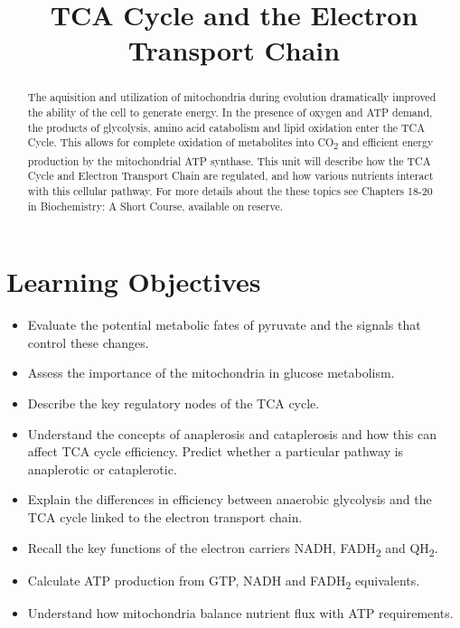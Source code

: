 \documentclass{tufte-handout}
\title{TCA Cycle and the Electron Transport Chain}
\author{}
\date{}  %
\begin{document}
\maketitle%

\begin{abstract}
\noindent The aquisition and utilization of mitochondria during evolution dramatically improved the ability of the cell to generate energy.  In the presence of oxygen and ATP demand, the products of glycolysis, amino acid catabolism and lipid oxidation enter the TCA Cycle.  This allows for complete oxidation of metabolites into CO\textsubscript{2} and efficient energy production by the mitochondrial ATP synthase.  This unit will describe how the TCA Cycle and Electron Transport Chain are regulated, and how various nutrients interact with this cellular pathway.  For more details about the these topics see Chapters 18-20 in Biochemistry: A Short Course\cite{Berg2015}, available on reserve.
\end{abstract}
\tableofcontents
\pagebreak
\section{Learning Objectives}

\begin{itemize}
\item Evaluate the potential metabolic fates of pyruvate and the signals that control these changes.
\item Assess the importance of the mitochondria in glucose metabolism.
\item Describe the key regulatory nodes of the TCA cycle.
\item Understand the concepts of anaplerosis and cataplerosis and how this can affect TCA cycle efficiency.  Predict whether a particular pathway is anaplerotic or cataplerotic.
\item Explain the differences in efficiency between anaerobic glycolysis and the TCA cycle linked to the electron transport chain.
\item Recall the key functions of the electron carriers NADH, FADH\textsubscript{2} and QH\textsubscript{2}.
\item Calculate ATP production from GTP, NADH and FADH\textsubscript{2} equivalents.
\item Understand how mitochondria balance nutrient flux with ATP requirements.
\end{itemize}
\end{document}
